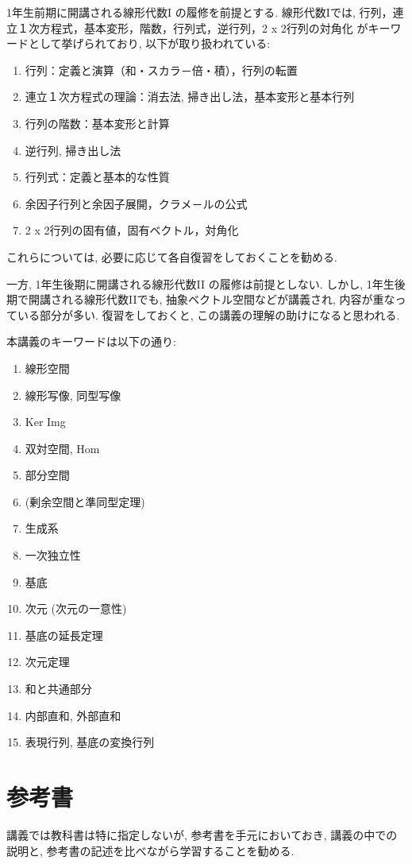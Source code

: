 1年生前期に開講される線形代数I
の履修を前提とする.
線形代数Iでは,
行列，連立１次方程式，基本変形，階数，行列式，逆行列，2 x 2行列の対角化
がキーワードとして挙げられており,
以下が取り扱われている:
\begin{enumerate}
\item 行列：定義と演算（和・スカラ－倍・積），行列の転置
\item 連立１次方程式の理論：消去法, 掃き出し法，基本変形と基本行列
\item 行列の階数：基本変形と計算
\item 逆行列, 掃き出し法
\item 行列式：定義と基本的な性質
\item 余因子行列と余因子展開，クラメ－ルの公式
\item 2 x 2行列の固有値，固有ベクトル，対角化
\end{enumerate}
これらについては,
必要に応じて各自復習をしておくことを勧める.


一方,
1年生後期に開講される線形代数II
の履修は前提としない.
しかし,
1年生後期で開講される線形代数IIでも,
抽象ベクトル空間などが講義され,
内容が重なっている部分が多い.
復習をしておくと,
この講義の理解の助けになると思われる.

本講義のキーワードは以下の通り:
\begin{enumerate}
\item 線形空間
\item 線形写像, 同型写像
\item Ker Img
\item 双対空間, Hom
\item 部分空間
\item (剰余空間と準同型定理)
\item 生成系
\item 一次独立性
\item 基底
\item 次元 (次元の一意性)
\item 基底の延長定理
\item 次元定理
\item 和と共通部分
\item 内部直和, 外部直和
\item 表現行列, 基底の変換行列
\end{enumerate}

\section{参考書}
講義では教科書は特に指定しないが,
参考書を手元においておき,
講義の中での説明と,
参考書の記述を比べながら学習することを勧める.

